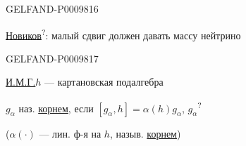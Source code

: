 \begin{GelfandAdjacentEvidence}{GELFAND-P000981}{6}


\underline{Новиков}\textsuperscript{?}: малый сдвиг должен давать массу нейтрино
\end{GelfandAdjacentEvidence}
\begin{GelfandAdjacentEvidence}{GELFAND-P000981}{7}


\underline{И.М.Г.}\qquad $h$ --- картановская подалгебра

$g_\alpha$ наз. \underline{корнем}, если $[g_\alpha,h]=\alpha(h)g_\alpha$, $g_\alpha$\textsuperscript{?}
\end{GelfandAdjacentEvidence}


($\alpha(\cdot)$ --- лин. ф-я на $h$, назыв. \underline{корнем})


